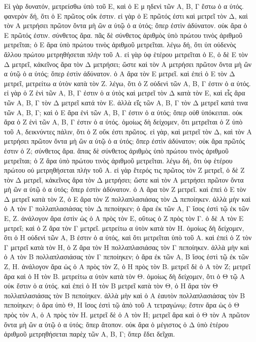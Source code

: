 \begin{Parallel}{}{}
{{\greekfont Εἰ γὰρ δυνατόν, μετρείσθω ὑπὸ τοῦ Ε, καὶ ὁ Ε μ ηδενὶ τῶν Α, Β, Γ
ἔστω ὁ α ὐτός. φανερὸν δή, ὅτι ὁ Ε πρῶτος οὔκ ἐστιν. εἰ 
γὰρ ὁ Ε πρῶτός ἐστι καὶ μετρεῖ τὸν Δ, καὶ τὸν Α μετρήσει
πρῶτον ὄντα μὴ ὢν α ὐτῷ ὁ α ὐτός; ὅπερ ἐστὶν ἀδύνατον.
οὐκ ἄρα ὁ Ε πρῶτός ἐστιν. σύνθετος ἄρα. πᾶς δὲ σύνθετος ἀριθμὸς
ὑπὸ πρώτου τινὸς ἀριθμοῦ μετρεῖται; ὁ Ε ἄρα ὑπὸ πρώτου τινὸς
ἀριθμοῦ μετρεῖται.
λέγω δή, ὅτι ὑπ οὐδενὸς
ἄλλου πρώτου μετρηθήσεται πλὴν τοῦ Α. εἰ γὰρ ὑφ ἑτέρου μετρεῖται
ὁ Ε, ὁ δὲ Ε τὸν Δ μετρεῖ, κἀκεῖνος ἄρα τὸν Δ μετρήσει; ὥστε καὶ
τὸν Α  μετρήσει πρῶτον ὄντα μὴ ὢν α ὐτῷ ὁ α ὐτός; ὅπερ
ἐστὶν ἀδύνατον. ὁ Α ἄρα τὸν  Ε μετρεῖ. καὶ ἐπεὶ ὁ Ε τὸν Δ
μετρεῖ, μετρείτω α ὐτὸν κατὰ τὸν Ζ. λέγω, ὅτι ὁ Ζ οὐδενὶ τῶν
Α, Β, Γ ἐστιν ὁ α ὐτός. εἰ γὰρ ὁ Ζ ἑνὶ τῶν Α, Β, Γ ἐστιν ὁ
α ὐτὸς καὶ μετρεῖ τὸν Δ κατὰ τὸν Ε, καὶ εἷς ἄρα τῶν Α, Β, Γ
τὸν Δ μετρεῖ κατά τὸν Ε. ἀλλὰ εῖ̔ς τῶν Α, Β, Γ τὸν Δ μετρεῖ κατά
τινα τῶν Α, Β, Γ; καὶ ὁ Ε ἄρα ἑνὶ τῶν Α, Β, Γ
ἐστιν ὁ α ὐτός; ὅπερ οὐθ ὑπόκειται. οὐκ ἄρα ὁ Ζ ἑνὶ τῶν
Α, Β, Γ ἐστιν ὁ α ὐτός. ὁμοίως δὴ δείχομεν, ὅτι μετρεῖται ὁ Ζ
ὑπὸ τοῦ Α, δεικνύντες πάλιν, ὅτι ὁ Ζ οὔκ ἐστι πρῶτος. εἰ γὰρ,
καὶ μετρεῖ τὸν Δ, καὶ τὸν Α μετρήσει πρῶτον ὄντα μὴ ὢν α ὐτῷ
ὁ α ὐτός; ὅπερ ἐστὶν ἀδύνατον; οὐκ ἄρα πρῶτός ἐστιν ὁ Ζ;
σύνθετος ἄρα. ἅπας δὲ σύνθετος ἀριθμὸς ὑπὸ πρώτου τινὸς ἀριθμοῦ
μετρεῖται; ὁ Ζ ἄρα ὑπὸ πρώτου τινὸς ἀριθμοῦ μετρεῖται. λέγω δή,
ὅτι ὑφ ἑτέρου πρώτου οὐ μετρηθήσεται πλὴν τοῦ Α. εἰ γὰρ ἕτερός
τις πρῶτος τὸν Ζ μετρεῖ, ὁ δὲ Ζ τὸν Δ μετρεῖ, κἀκεῖνος ἄρα τὸν Δ
μετρήσει; ὥστε καὶ τὸν Α μετρήσει πρῶτον ὄντα μὴ ὢν α ὐτῷ
ὁ α ὐτός; ὅπερ ἐστὶν ἀδύνατον. ὁ Α ἄρα τὸν Ζ μετρεῖ. καὶ ἐπεὶ
ὁ Ε τὸν Δ μετρεῖ κατὰ τὸν Ζ, ὁ Ε ἄρα τὸν Ζ πολλαπλασιάσας
τὸν Δ πεποίηκεν. ἀλλὰ μὴν καὶ ὁ Α τὸν Γ πολλαπλασιάσας
τὸν Δ πεποίηκεν; ὁ ἄρα ἐκ τῶν Α, Γ ἴσος ἐστὶ τῷ ἐκ τῶν 
Ε, Ζ. ἀνάλογον ἄρα ἐστὶν ὡς ὁ Α πρὸς τὸν Ε, οὕτως ὁ Ζ
πρὸς τὸν Γ. ὁ δὲ Α τὸν Ε μετρεῖ; καὶ ὁ Ζ ἄρα τὸν Γ μετρεῖ. μετρείτω α ὐτὸν κατὰ τὸν Η. ὁμοίως δὴ δείχομεν, ὅτι 
ὁ Η οὐδενὶ τῶν Α, Β ἐστιν ὁ α ὐτός, καὶ ὅτι μετρεῖται ὑπὸ
τοῦ Α. καὶ ἐπεὶ ὁ Ζ τὸν Γ μετρεῖ κατὰ τὸν Η,  ὁ Ζ ἄρα τὸν Η
πολλαπλασιάσας τὸν Γ πεποίηκεν. ἀλλὰ μὴν καὶ ὁ Α τὸν Β πολλαπλασιάσας
τὸν Γ πεποίηκεν; ὁ ἄρα ἐκ τῶν Α, Β ἴσος ἐστὶ τῷ ἐκ τῶν Ζ, Η.
ἀνάλογον ἄρα ὡς ὁ Α πρὸς τὸν Ζ, ὁ Η πρὸς τὸν  Β.  μετρεῖ δὲ ὁ
Α τὸν Ζ; μετρεῖ ἄρα καὶ ὁ Η τὸν Β. μετρείτω
α ὐτὸν κατὰ τὸν Θ. ὁμοίως δὴ
δείχομεν, ὅτι ὁ Θ τῷ Α οὐκ ἔστιν
ὁ α ὐτός. καὶ ἐπεὶ ὁ Η τὸν Β μετρεῖ κατὰ τὸν Θ,  ὁ Η ἄρα τὸν
Θ πολλαπλασιάσας τὸν Β πεποίηκεν. ἀλλὰ μὴν καὶ ὁ Α ἑαυτὸν πολλαπλασιάσας τὸν Β πεποίηκεν; ὁ ἄρα ὑπὸ Θ, Η ἴσος ἐστὶ τῷ
ἀπὸ τοῦ Α τετραγώνῳ;  ἔστιν ἄρα ὡς ὁ Θ πρὸς τὸν Α, ὁ Α
πρὸς τὸν Η. μετρεῖ δὲ ὁ Α τὸν Η; μετρεῖ ἄρα καὶ ὁ Θ τὸν Α
πρῶτον ὄντα μὴ ὢν α ὐτῷ ὁ α ὐτός; ὅπερ ἄτοπον.
οὐκ ἄρα ὁ μέγιστος ὁ Δ ὑπὸ ἑτέρου ἀριθμοῦ μετρηθήσεται
παρὲχ τῶν Α, Β, Γ; ὅπερ ἔδει δεῖχαι.}}


\end{Parallel}
